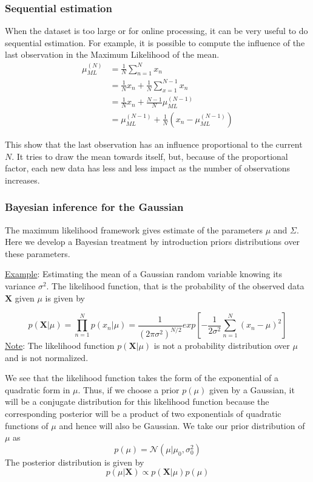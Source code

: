 \subsubsection{Sequential estimation}
When the dataset is too large or for online processing, it can be very useful to do sequential estimation. For example, it is possible to compute the influence of the last observation in the Maximum Likelihood of the mean.
\begin{equation}
\begin{split}
    \mu_{ML}^{(N)} & = \frac{1}{N}\sum_{n=1}^{N} x_n \\
     & = \frac{1}{N} x_n + \frac{1}{N}\sum_{x=1}^{N-1} x_n \\
     & = \frac{1}{N}x_n + \frac{N-1}{N}\mu_{ML}^{(N-1)} \\
     & =\mu_{ML}^{(N-1)} + \frac{1}{N}(x_n - \mu_{ML}^{(N-1)})
\end{split}
\end{equation}

This show that the last observation has an influence proportional to the current $N$. It tries to draw the mean towards itself, but, because of the proportional factor, each new data has less and less impact as the number of observations increases.

\subsubsection{Bayesian inference for the Gaussian}

The maximum likelihood framework gives estimate of the parameters $\mu$ and $\Sigma$. Here we develop a Bayesian treatment by introduction priors distributions over these parameters.

\underline{Example}: Estimating the mean of a Gaussian random variable knowing its variance $\sigma^2$. The likelihood function, that is the probability of the observed data $\boldsymbol{X}$ given $\mu$ is given by

\begin{equation}
    p(\boldsymbol{X}|\mu) = \prod_{n=1}^{N} p(x_n | \mu) = \frac{1}{(2\pi \sigma^2)^{N/2}} exp\left[ -\frac{1}{2\sigma^2}\sum_{n=1}^{N} (x_n - \mu)^2 \right]
\end{equation}
\underline{Note}: The likelihood function $p(\boldsymbol{X}|\mu)$ is not a probability distribution over $\mu$ and is not normalized.

We see that the likelihood function takes the form of the exponential of a quadratic form in $\mu$. Thus, if we choose a prior $p(\mu)$ given by a Gaussian, it will be a conjugate distribution for this likelihood function because the corresponding posterior will be a product of two exponentials of quadratic functions of $\mu$ and hence will also be Gaussian.
We take our prior distribution of $\mu$ as
\begin{equation}
    p(\mu) = \mathcal{N}(\mu|\mu_0, \sigma_0^2)
\end{equation}
The posterior distribution is given by 
\begin{equation}
    p(\mu|\boldsymbol{X}) \propto p(\boldsymbol{X}|\mu) p(\mu)
\end{equation}

